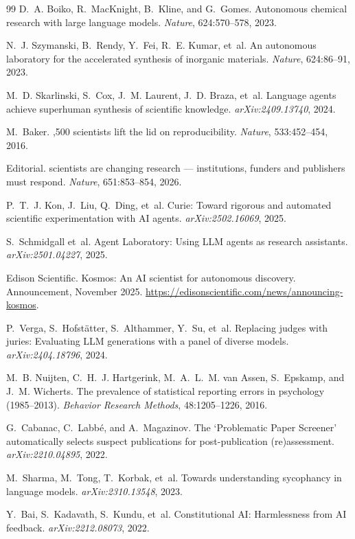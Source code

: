 \documentclass[11pt]{article}
\begin{document}
\begin{thebibliography}{99}
D.~A. Boiko, R.~MacKnight, B.~Kline, and G.~Gomes.
\newblock Autonomous chemical research with large language models.
\newblock \emph{Nature}, 624:570--578, 2023.

N.~J. Szymanski, B.~Rendy, Y.~Fei, R.~E. Kumar, et~al.
\newblock An autonomous laboratory for the accelerated synthesis of inorganic materials.
\newblock \emph{Nature}, 624:86--91, 2023.

M.~D. Skarlinski, S.~Cox, J.~M. Laurent, J.~D. Braza, et~al.
\newblock Language agents achieve superhuman synthesis of scientific knowledge.
\newblock \emph{arXiv:2409.13740}, 2024.

M.~Baker.
,500 scientists lift the lid on reproducibility.
\newblock \emph{Nature}, 533:452--454, 2016.

{Editorial}.
 scientists are changing research --- institutions, funders and publishers must respond.
\newblock \emph{Nature}, 651:853--854, 2026.

P.~T.~J. Kon, J.~Liu, Q.~Ding, et~al.
\newblock Curie: Toward rigorous and automated scientific experimentation with {AI} agents.
\newblock \emph{arXiv:2502.16069}, 2025.

S.~Schmidgall et~al.
\newblock Agent {Laboratory}: Using {LLM} agents as research assistants.
\newblock \emph{arXiv:2501.04227}, 2025.

{Edison Scientific}.
\newblock Kosmos: An {AI} scientist for autonomous discovery.
\newblock Announcement, November 2025.
\newblock \url{https://edisonscientific.com/news/announcing-kosmos}.

P.~Verga, S.~Hofst\"atter, S.~Althammer, Y.~Su, et~al.
\newblock Replacing judges with juries: Evaluating {LLM} generations with a panel of diverse models.
\newblock \emph{arXiv:2404.18796}, 2024.

M.~B. Nuijten, C.~H.~J. Hartgerink, M.~A.~L.~M. van Assen, S.~Epskamp, and J.~M. Wicherts.
\newblock The prevalence of statistical reporting errors in psychology (1985--2013).
\newblock \emph{Behavior Research Methods}, 48:1205--1226, 2016.

G.~Cabanac, C.~Labb\'e, and A.~Magazinov.
\newblock The `{Problematic} {Paper} {Screener}' automatically selects suspect publications for post-publication (re)assessment.
\newblock \emph{arXiv:2210.04895}, 2022.

M.~Sharma, M.~Tong, T.~Korbak, et~al.
\newblock Towards understanding sycophancy in language models.
\newblock \emph{arXiv:2310.13548}, 2023.

Y.~Bai, S.~Kadavath, S.~Kundu, et~al.
\newblock Constitutional {AI}: Harmlessness from {AI} feedback.
\newblock \emph{arXiv:2212.08073}, 2022.

\end{thebibliography}
\end{document}
